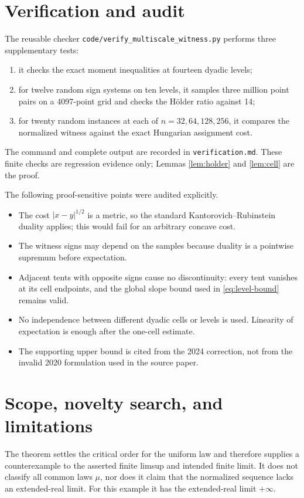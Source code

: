 \documentclass[11pt]{article}
\begin{document}
\section{Verification and audit}

The reusable checker \texttt{code/verify\_multiscale\_witness.py} performs
three supplementary tests:
\begin{enumerate}
\item it checks the exact moment inequalities at fourteen dyadic levels;
\item for twelve random sign systems on ten levels, it samples three million
point pairs on a 4097-point grid and checks the Hölder ratio against 14;
\item for twenty random instances at each of \(n=32,64,128,256\), it compares
the normalized witness against the exact Hungarian assignment cost.
\end{enumerate}
The command and complete output are recorded in \texttt{verification.md}.
These finite checks are regression evidence only; Lemmas \ref{lem:holder} and
\ref{lem:cell} are the proof.

The following proof-sensitive points were audited explicitly.
\begin{itemize}
\item The cost \(|x-y|^{1/2}\) is a metric, so the standard
Kantorovich--Rubinstein duality applies; this would fail for an arbitrary
concave cost.
\item The witness signs may depend on the samples because duality is a
pointwise supremum before expectation.
\item Adjacent tents with opposite signs cause no discontinuity: every tent
vanishes at its cell endpoints, and the global slope bound used in
\eqref{eq:level-bound} remains valid.
\item No independence between different dyadic cells or levels is used.
Linearity of expectation is enough after the one-cell estimate.
\item The supporting upper bound is cited from the 2024 correction, not from
the invalid 2020 formulation used in the source paper.
\end{itemize}

\section{Scope, novelty search, and limitations}

The theorem settles the critical order for the uniform law and therefore
supplies a counterexample to the asserted finite limsup and intended finite
limit.  It does not classify all common laws \(\mu\), nor does it claim that
the normalized sequence lacks an extended-real limit.  For this example it
has the extended-real limit \(+\infty\).
\end{document}
